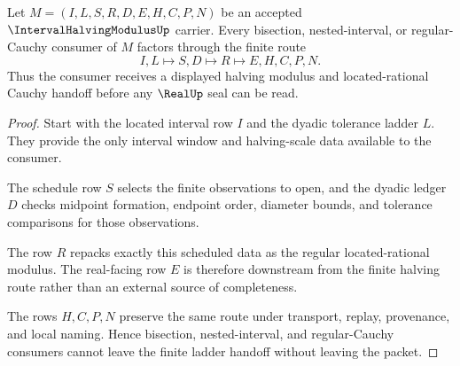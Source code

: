 \begin{theorem}
\label{thm:interval-halving-modulus-ladder-handoff}
Let $M=(I,L,S,R,D,E,H,C,P,N)$ be an accepted $\IntervalHalvingModulusUp$ carrier. Every bisection, nested-interval, or regular-Cauchy consumer of $M$ factors through the finite route
$$
I,L
\longmapsto
S,D
\longmapsto
R
\longmapsto
E,H,C,P,N .
$$
Thus the consumer receives a displayed halving modulus and located-rational Cauchy handoff before any $\RealUp$ seal can be read.
\end{theorem}
\begin{proof}
Start with the located interval row $I$ and the dyadic tolerance ladder $L$. They provide the only interval window and halving-scale data available to the consumer.

The schedule row $S$ selects the finite observations to open, and the dyadic ledger $D$ checks midpoint formation, endpoint order, diameter bounds, and tolerance comparisons for those observations.

The row $R$ repacks exactly this scheduled data as the regular located-rational modulus. The real-facing row $E$ is therefore downstream from the finite halving route rather than an external source of completeness.

The rows $H,C,P,N$ preserve the same route under transport, replay, provenance, and local naming. Hence bisection, nested-interval, and regular-Cauchy consumers cannot leave the finite ladder handoff without leaving the packet.
\end{proof}


\begin{closurestatus}{\IntervalHalvingModulusUp}
  \theoryclosure{\seedClosure}
  \formalstatus{\theoremCheckedV}
\end{closurestatus}
